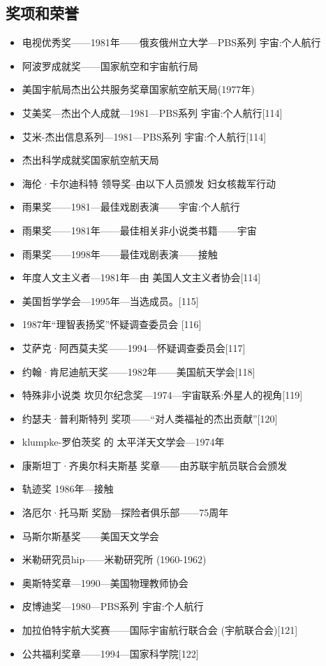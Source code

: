 \subsection{奖项和荣誉}
\begin{itemize}
\item 电视优秀奖——1981年——俄亥俄州立大学—PBS系列 宇宙:个人航行
\item 阿波罗成就奖——国家航空和宇宙航行局
\item 美国宇航局杰出公共服务奖章国家航空航天局(1977年)
\item 艾美奖—杰出个人成就—1981—PBS系列 宇宙:个人航行[114]
\item 艾米-杰出信息系列—1981—PBS系列 宇宙:个人航行[114]
\item 杰出科学成就奖国家航空航天局
\item 海伦·卡尔迪科特 领导奖–由以下人员颁发 妇女核裁军行动
\item 雨果奖——1981—最佳戏剧表演——宇宙:个人航行
\item 雨果奖——1981年——最佳相关非小说类书籍——宇宙
\item 雨果奖——1998年——最佳戏剧表演——接触
\item 年度人文主义者—1981年—由 美国人文主义者协会[114]
\item 美国哲学学会—1995年—当选成员。[115]
\item 1987年“理智表扬奖”怀疑调查委员会 [116]
\item 艾萨克·阿西莫夫奖——1994—怀疑调查委员会[117]
\item 约翰·肯尼迪航天奖——1982年——美国航天学会[118]
\item 特殊非小说类 坎贝尔纪念奖—1974—宇宙联系:外星人的视角[119]
\item 约瑟夫·普利斯特列 奖项——“对人类福祉的杰出贡献”[120]
\item klumpke-罗伯茨奖 的 太平洋天文学会—1974年
\item 康斯坦丁·齐奥尔科夫斯基 奖章——由苏联宇航员联合会颁发
\item 轨迹奖 1986年—接触
\item 洛厄尔·托马斯 奖励—探险者俱乐部——75周年
\item 马斯尔斯基奖——美国天文学会
\item 米勒研究员hip——米勒研究所 (1960-1962)
\item 奥斯特奖章—1990—美国物理教师协会
\item 皮博迪奖—1980—PBS系列 宇宙:个人航行
\item 加拉伯特宇航大奖赛——国际宇宙航行联合会 (宇航联合会)[121]
\item 公共福利奖章——1994—国家科学院[122]

\end{itemize}
